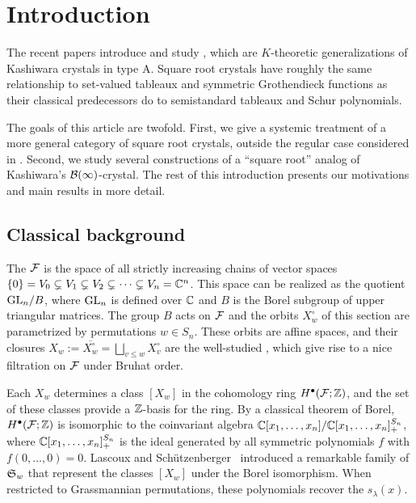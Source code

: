 \documentclass[11pt]{article}
\begin{document}
\tableofcontents

 
\section{Introduction}

The recent papers \cite{Yu23,MT2023,MTY} introduce and study 
, which are $K$-theoretic generalizations of Kashiwara crystals in type A. Square root crystals
 have roughly the same relationship to set-valued tableaux and symmetric Grothendieck functions as their classical predecessors do to semistandard tableaux and Schur polynomials. 
 
 The goals of this article are twofold. First, we give a systemic treatment of a more general category of square root crystals, outside the regular case considered in \cite{MT2023,MTY}. Second, we study several constructions of a   ``square root'' analog of Kashiwara's $\mathcal{B}(\infty)$-crystal.
The rest of this introduction presents our motivations and main results in more detail.

\subsection{Classical background}
The  $\mathcal{F}$ is the space of all strictly increasing chains of vector spaces
$
\{0\} = V_0 \subsetneq V_1 \subsetneq V_2 \subsetneq \cdots \subsetneq V_n = \mathbb{C}^n
$. 
This space
can be realized as the quotient $\mathrm{GL}_n/ B$, where $\mathrm{GL}_n$ is defined over $\mathbb{C}$ and $B$ is the Borel subgroup of upper triangular matrices.
The group $B$ acts on $\mathcal{F}$ and the orbits $X_w^{\circ}$ of this section are parametrized by permutations $w \in S_n$. These orbits are affine spaces, and their closures $X_w := \overline{X_w^{\circ}} = \bigsqcup_{v \leq w} X_v^{\circ}$ are the well-studied , which give rise to a nice filtration on $\mathcal{F}$ under Bruhat order.

Each $X_w$ determines a class $[X_w]$ in the cohomology ring $H^{\bullet}(\mathcal{F}; \mathbb{Z})$, 
and the set of these classes provide a $\mathbb{Z}$-basis for the ring.
By a classical theorem of Borel, $H^{\bullet}(\mathcal{F}; \mathbb{Z})$ is isomorphic to the coinvariant algebra $\mathbb{C}[x_1, \dotsc, x_n] / \mathbb{C}[x_1, \dotsc, x_n]_+^{S_n}$, where $\mathbb{C}[x_1, \dotsc, x_n]_+^{S_n}$ is the ideal generated by all symmetric polynomials $f$ with $f(0,\dotsc,0) = 0$.
Lascoux and Sch\"utzenberger~\cite{LS82,LS83} introduced a remarkable family of  $\mathfrak S_w$ that represent the classes $[X_w]$ under the Borel isomorphism.
When restricted to Grassmannian permutations,
these polynomials recover the  $s_{\lambda}(x)$.
\end{document}
